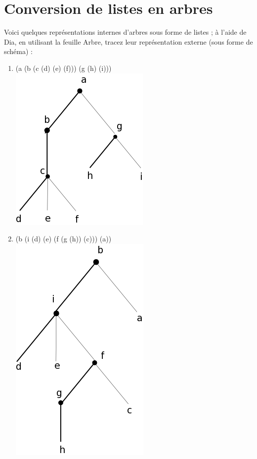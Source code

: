 \documentclass[a4paper, 11pt]{article}
\begin{document}
\section{Conversion de listes en arbres}
Voici quelques représentations internes d'arbres sous forme de listes ; à l'aide de Dia, en utilisant la feuille Arbre, tracez leur représentation externe (sous forme de schéma) :
\begin{enumerate}
    \item (a (b (c (d) (e) (f))) (g (h) (i)))\\\includegraphics[scale=0.3]{reponse1.png}
    \item (b (i (d) (e) (f (g (h)) (c))) (a))\\\includegraphics[scale=0.3]{reponse2.png}

\end{enumerate}
\end{document}

